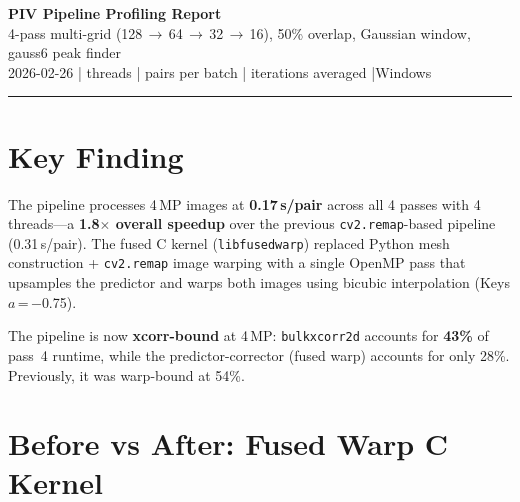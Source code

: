 \documentclass[10pt,a4paper,twocolumn]{article}
\begin{document}
\begin{center}
{\Large\bfseries PIV Pipeline Profiling Report}\\[3pt]
{\small 4-pass multi-grid (128\,$\to$\,64\,$\to$\,32\,$\to$\,16), 50\% overlap, Gaussian window, gauss6 peak finder}\\[2pt]
{\small\color{gray} 2026-02-26 \quad| threads \quad| pairs per batch \quad| iterations averaged \quad|\quad Windows}
\end{center}

\vspace{-2pt}
\rule{\columnwidth}{0.4pt}

\section{Key Finding}

The pipeline processes 4\,MP images at \textbf{0.17\,s/pair} across all 4 passes with 4 threads---a \textbf{1.8$\times$ overall speedup} over the previous \texttt{cv2.remap}-based pipeline (0.31\,s/pair). The fused C kernel (\texttt{libfusedwarp}) replaced Python mesh construction + \texttt{cv2.remap} image warping with a single OpenMP pass that upsamples the predictor and warps both images using bicubic interpolation (Keys $a$\,=\,$-$0.75).

The pipeline is now \textbf{xcorr-bound} at 4\,MP: \texttt{bulkxcorr2d} accounts for \textbf{43\%} of pass~4 runtime, while the predictor-corrector (fused warp) accounts for only 28\%. Previously, it was warp-bound at 54\%.

\section{Before vs After: Fused Warp C Kernel}
\end{document}
